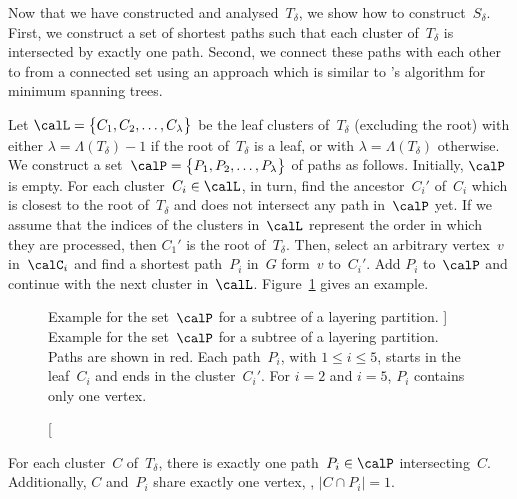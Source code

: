 Now that we have constructed and analysed~$T_\delta$, we show how to construct~$S_\delta$.
First, we construct a set of shortest paths such that each cluster of~$T_\delta$ is intersected by exactly one path.
Second, we connect these paths with each other to from a connected set using an approach which is similar to 's algorithm for minimum spanning trees.

Let $\calL = \big \{ C_1, C_2, \ldots, C_\lambda \big \}$ be the leaf clusters of~$T_\delta$ (excluding the root) with either $\lambda = \Lambda(T_\delta) - 1$ if the root of~$T_\delta$ is a leaf, or with  $\lambda = \Lambda(T_\delta)$ otherwise.
We construct a set~$\calP = \big \{ P_1, P_2, \ldots, P_\lambda \big \}$ of paths as follows.
Initially, $\calP$ is empty.
For each cluster~$C_i \in \calL$, in turn, find the ancestor~$C_i'$ of~$C_i$ which is closest to the root of~$T_\delta$ and does not intersect any path in~$\calP$ yet.
If we assume that the indices of the clusters in~$\calL$ represent the order in which they are processed, then $C_1'$ is the root of~$T_\delta$.
Then, select an arbitrary vertex~$v$ in~$\calC_i$ and find a shortest path~$P_i$ in~$G$ form~$v$ to~$C_i'$.
Add $P_i$ to~$\calP$ and continue with the next cluster in~$\calL$.
Figure~\ref{fig:LayPartPaths} gives an example.

\begin{figure}
    [htb]
    \centering
    
    \caption
    [%
        Example for the set~$\calP$ for a subtree of a layering partition.
    ]
    {%
        Example for the set~$\calP$ for a subtree of a layering partition.
        Paths are shown in red.
        Each path~$P_i$, with $1 \leq i \leq 5$, starts in the leaf~$C_i$ and ends in the cluster~$C_i'$.
        For $i = 2$ and $i = 5$, $P_i$ contains only one vertex.
    }
    \label{fig:LayPartPaths}
\end{figure}


\begin{lemma}
    \label{lem:clusterPath}
For each cluster~\( C \) of~\( T_\delta \), there is exactly one path~\( P_i \in \calP \) intersecting~\( C \).
Additionally, \( C \) and~\( P_i \) share exactly one vertex, \ie, \( |C \cap P_i| = 1 \).
\end{lemma}

